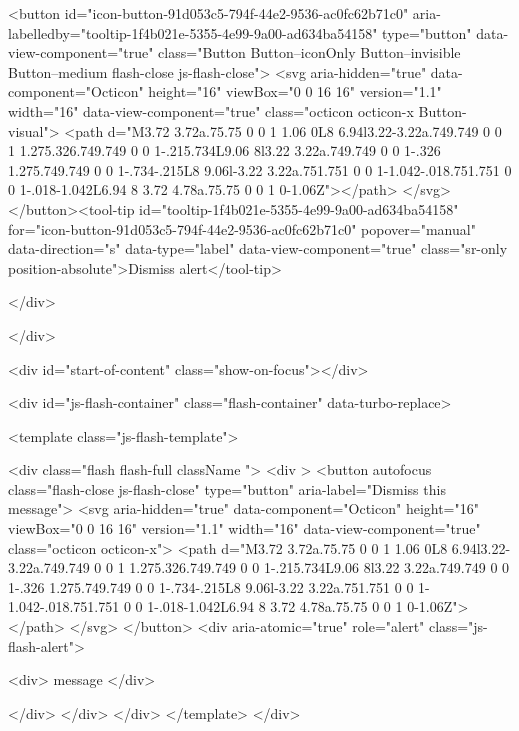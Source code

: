     <button id="icon-button-91d053c5-794f-44e2-9536-ac0fc62b71c0" aria-labelledby="tooltip-1f4b021e-5355-4e99-9a00-ad634ba54158" type="button" data-view-component="true" class="Button Button--iconOnly Button--invisible Button--medium flash-close js-flash-close">  <svg aria-hidden="true" data-component="Octicon" height="16" viewBox="0 0 16 16" version="1.1" width="16" data-view-component="true" class="octicon octicon-x Button-visual">
    <path d="M3.72 3.72a.75.75 0 0 1 1.06 0L8 6.94l3.22-3.22a.749.749 0 0 1 1.275.326.749.749 0 0 1-.215.734L9.06 8l3.22 3.22a.749.749 0 0 1-.326 1.275.749.749 0 0 1-.734-.215L8 9.06l-3.22 3.22a.751.751 0 0 1-1.042-.018.751.751 0 0 1-.018-1.042L6.94 8 3.72 4.78a.75.75 0 0 1 0-1.06Z"></path>
</svg>
</button><tool-tip id="tooltip-1f4b021e-5355-4e99-9a00-ad634ba54158" for="icon-button-91d053c5-794f-44e2-9536-ac0fc62b71c0" popover="manual" data-direction="s" data-type="label" data-view-component="true" class="sr-only position-absolute">Dismiss alert</tool-tip>


  
</div>
        
          
    </div>

  <div id="start-of-content" class="show-on-focus"></div>








    <div id="js-flash-container" class="flash-container" data-turbo-replace>




  <template class="js-flash-template">
    
<div class="flash flash-full   {{ className }}">
  <div >
    <button autofocus class="flash-close js-flash-close" type="button" aria-label="Dismiss this message">
      <svg aria-hidden="true" data-component="Octicon" height="16" viewBox="0 0 16 16" version="1.1" width="16" data-view-component="true" class="octicon octicon-x">
    <path d="M3.72 3.72a.75.75 0 0 1 1.06 0L8 6.94l3.22-3.22a.749.749 0 0 1 1.275.326.749.749 0 0 1-.215.734L9.06 8l3.22 3.22a.749.749 0 0 1-.326 1.275.749.749 0 0 1-.734-.215L8 9.06l-3.22 3.22a.751.751 0 0 1-1.042-.018.751.751 0 0 1-.018-1.042L6.94 8 3.72 4.78a.75.75 0 0 1 0-1.06Z"></path>
</svg>
    </button>
    <div aria-atomic="true" role="alert" class="js-flash-alert">
      
      <div>{{ message }}</div>

    </div>
  </div>
</div>
  </template>
</div>


